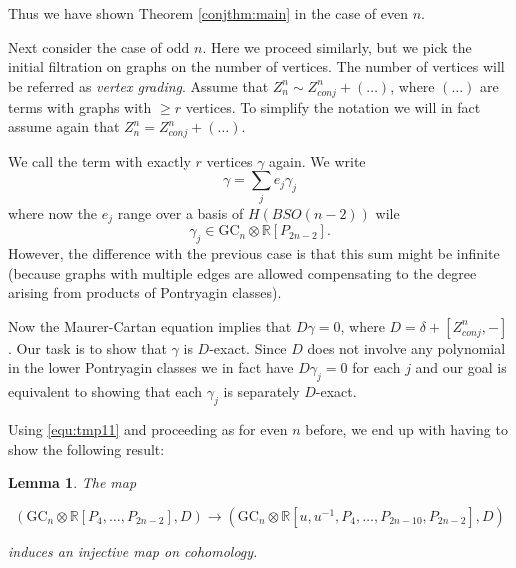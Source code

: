 \documentclass[a4paper]{amsart}
\theoremstyle{plain}
\newtheorem{lemma}[thm]{Lemma}
\theoremstyle{definition}
\newcommand{\R}{{\mathbb{R}}}
\newcommand{\GC}{\mathrm{GC}}
\newcommand{\SO}{\mathit{SO}}
\newcommand{\beq}[1]{
\begin{equation}\label{#1}
}
\newcommand{\eeq}{
\end{equation}
}
\begin{document}
Thus we have shown Theorem \ref{conjthm:main} in the case of even $n$.

Next consider the case of odd $n$. Here we proceed similarly, but we pick the initial filtration on graphs on the number of vertices. The number of vertices will be referred as {\it  vertex grading}.
Assume that $Z_{n}^n \sim Z_{conj}^n + (\dots)$, where $(\dots)$ are terms with graphs with $\geq r$ vertices.
To simplify the notation we will in fact assume again that $Z_{n}^n = Z_{conj}^n + (\dots)$.

We call the term with exactly $r$ vertices $\gamma$ again.
We write 
\[
\gamma =\sum_j e_j \gamma_j
\]
where now the $e_j$ range over a basis of $H(B\SO(n-2))$ wile 
\[
\gamma_j\in \GC_n \otimes \R[P_{2n-2}].
\]
However, the difference with the previous case is that this sum might be infinite (because graphs with multiple edges are allowed compensating to the degree arising from products of Pontryagin classes). 

Now the Maurer-Cartan equation implies that $D\gamma=0$, where $D=\delta+[Z_{conj}^n,-]$.
Our task is to show that $\gamma$ is $D$-exact. Since $D$ does not involve any polynomial in the lower Pontryagin classes we in fact have $D\gamma_j=0$ for each $j$ and our goal is equivalent to showing that each $\gamma_j$ is separately $D$-exact.

Using \eqref{equ:tmp11} and proceeding as for even $n$ before, we end up with having to show the following result:
\begin{lemma}\label{l:map_odd}
The map 
\beq{eq:map_odd}
(\GC_n \otimes \R[P_4,\dots,P_{2n-2}], D)
\to 
(\GC_n \otimes \R[u,u^{-1}, P_4,\dots,P_{2n-10},P_{2n-2}], D)
\eeq
induces an injective map on cohomology. 
\end{lemma}
\end{document}
